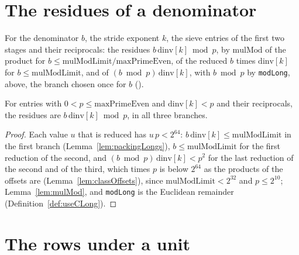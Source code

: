 \section{The residues of a denominator}\label{sec:bp}

\begin{definition}\label{def:fillBpList}
  \leanok
  For the denominator $b$, the stride exponent $k$, the sieve entries of the first two stages and
  their reciprocals: the residues $b\,\mathrm{dinv}[k] \bmod p$, by $\mathrm{mulMod}$ of the product
  for $b \le \mathrm{mulModLimit}/\mathrm{maxPrimeEven}$, of the reduced $b$ times
  $\mathrm{dinv}[k]$ for $b \le \mathrm{mulModLimit}$, and of $(b \bmod p) \,\mathrm{dinv}[k]$, with
  $b \bmod p$ by \verb|modLong|, above, the branch chosen once for $b$
  ().
\end{definition}

\begin{lemma}\label{lem:fillBpList}
  \leanok
  For entries with $0 < p \le \mathrm{maxPrimeEven}$ and $\mathrm{dinv}[k] < p$ and their
  reciprocals, the residues are $b\, \mathrm{dinv}[k] \bmod p$, in all three branches.
\end{lemma}

\begin{proof}
  \leanok
  Each value $u$ that is reduced has $u\, p < 2^{64}$:
  $b\,\mathrm{dinv}[k] \le \mathrm{mulModLimit}$ in the first branch
  (Lemma~\ref{lem:packingLongs}), $b \le \mathrm{mulModLimit}$ for the first reduction of the
  second, and $(b \bmod p)\,\mathrm{dinv}[k] < p^2$ for the last reduction of the second and of the
  third, which times $p$ is below $2^{64}$ as the products of the offsets are
  (Lemma~\ref{lem:classOffsets}), since $\mathrm{mulModLimit} < 2^{32}$ and $p \le 2^{10}$;
  Lemma~\ref{lem:mulMod}, and \verb|modLong| is the Euclidean remainder
  (Definition~\ref{def:useCLong}).
\end{proof}

\section{The rows under a unit}\label{sec:scaling}

